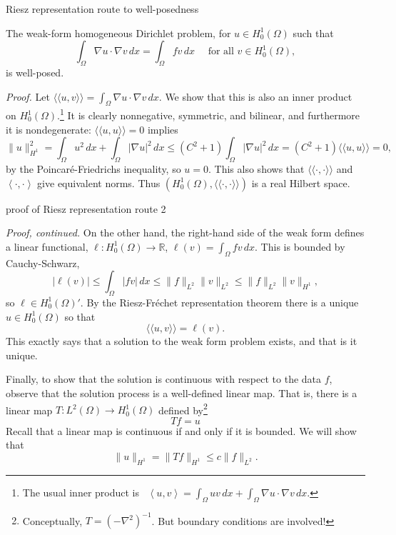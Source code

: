 \documentclass[10pt,
               svgnames,
               hyperref={colorlinks,
                         citecolor=DeepPink4,
                         linkcolor=FireBrick,
                         urlcolor=blue},
               usepdftitle=false]{beamer}
\newcommand{\RR}{\mathbb{R}}
\newcommand{\grad}{\nabla}
\newcommand{\ip}[2]{\left<#1,#2\right>}
\newcommand{\iip}[2]{\langle\!\langle #1, #2 \rangle\!\rangle}
\begin{document}
\begin{frame}{Riesz representation route to well-posedness}

\begin{theorem}
The weak-form homogeneous Dirichlet problem, for $u\in H_0^1(\Omega)$ such that
    $$\int_\Omega \grad u \cdot \grad v\,dx = \int_\Omega f v\,dx \quad \text{ for all } v\in H_0^1(\Omega),$$
\alert{is well-posed}.
\end{theorem}

\small
\emph{Proof.} Let $\iip{u}{v} = \int_\Omega \grad u \cdot \grad v\,dx$.  We show that this is also an inner product on $H_0^1(\Omega)$.\footnote{The usual inner product is \, $\ip{u}{v} = \int_\Omega u v\,dx + \int_\Omega \grad u \cdot \grad v\,dx$.}  It is clearly nonnegative, symmetric, and bilinear, and furthermore it is nondegenerate: $\iip{u}{u}=0$ implies
	$$\|u\|_{H^1}^2 = \int_\Omega u^2\,dx + \int_\Omega |\grad u|^2\,dx \le (C^2+1)\int_\Omega |\grad u|^2\,dx = (C^2+1) \iip{u}{u} = 0,$$
by the Poincar\'e-Friedrichs inequality, so $u=0$.  This also shows that $\iip{\cdot}{\cdot}$ and $\ip{\cdot}{\cdot}$ give equivalent norms.  Thus $(H_0^1(\Omega),\iip{\cdot}{\cdot})$ is a real Hilbert space.
\end{frame}


\begin{frame}{proof of Riesz representation route 2}

\small
\emph{Proof, continued.} 
On the other hand, the right-hand side of the weak form defines a linear functional, $\ell:H_0^1(\Omega)\to \RR$, $\ell(v)=\int_\Omega fv\,dx$.  This is bounded by Cauchy-Schwarz,
    $$|\ell(v)| \le \int_\Omega |fv|\,dx \le \|f\|_{L^2}\|v\|_{L^2} \le \|f\|_{L^2}\|v\|_{H^1},$$
so $\ell \in H_0^1(\Omega)'$.  By the Riesz-Fr\'echet representation theorem there is a unique $u\in H_0^1(\Omega)$ so that
   $$\iip{u}{v} = \ell(v).$$
This exactly says that a solution to the weak form problem exists, and that is it unique.

\medskip
Finally, to show that the solution is continuous with respect to the data $f$, observe that the solution process is a well-defined linear map.  That is, there is a linear map $T:L^2(\Omega) \to H_0^1(\Omega)$ defined by\footnote{Conceptually, $T=(-\grad^2)^{-1}$.  But boundary conditions are involved!}
	$$T f = u$$
Recall that a linear map is continuous if and only if it is bounded.  We will show that
    $$\|u\|_{H^1} = \|T f\|_{H^1} \le c \|f\|_{L^2}.$$
\end{frame}
\end{document}
